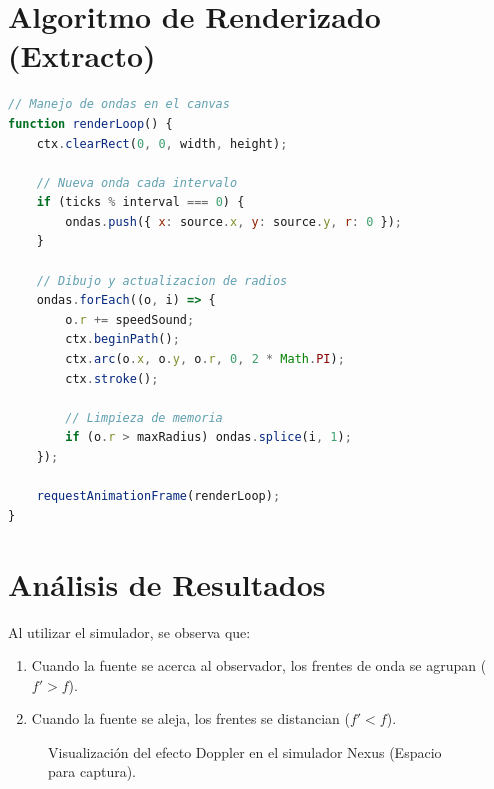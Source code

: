 \documentclass[12pt,a4paper]{article}
\begin{document}
\section{Algoritmo de Renderizado (Extracto)}
\begin{lstlisting}[language=JavaScript]
// Manejo de ondas en el canvas
function renderLoop() {
    ctx.clearRect(0, 0, width, height);
    
    // Nueva onda cada intervalo
    if (ticks % interval === 0) {
        ondas.push({ x: source.x, y: source.y, r: 0 });
    }
    
    // Dibujo y actualizacion de radios
    ondas.forEach((o, i) => {
        o.r += speedSound;
        ctx.beginPath();
        ctx.arc(o.x, o.y, o.r, 0, 2 * Math.PI);
        ctx.stroke();
        
        // Limpieza de memoria
        if (o.r > maxRadius) ondas.splice(i, 1);
    });
    
    requestAnimationFrame(renderLoop);
}
\end{lstlisting}

\section{Análisis de Resultados}
Al utilizar el simulador, se observa que:
\begin{enumerate}
    \item Cuando la fuente se acerca al observador, los frentes de onda se agrupan ($f' > f$).
    \item Cuando la fuente se aleja, los frentes se distancian ($f' < f$).
\end{enumerate}

\begin{figure}[h]
    \centering
    \caption{Visualización del efecto Doppler en el simulador Nexus (Espacio para captura).}
\end{figure}
\end{document}

